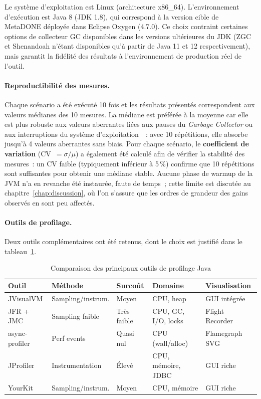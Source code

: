 Le système d'exploitation est Linux (architecture x86\_64). L'environnement
d'exécution est Java 8 (JDK 1.8), qui correspond à la version cible de
MetaDONE déployée dans Eclipse Oxygen (4.7.0). Ce choix contraint certaines
options de collecteur GC disponibles dans les versions ultérieures du JDK
(ZGC et Shenandoah n'étant disponibles qu'à partir de Java 11 et 12
respectivement), mais garantit la fidélité des résultats à l'environnement
de production réel de l'outil.

\paragraph{Reproductibilité des mesures.}
Chaque scénario a été exécuté 10 fois et les résultats présentés correspondent aux valeurs médianes des 10 mesures. La médiane est préférée à la moyenne car elle est plus robuste aux valeurs aberrantes liées aux pauses du \textit{Garbage Collector} ou aux interruptions du système d'exploitation~\cite{georges2007statistically}~: avec 10 répétitions, elle absorbe jusqu'à 4 valeurs aberrantes sans biais. Pour chaque scénario, le \textbf{coefficient de variation} (CV~$= \sigma / \mu$) a également été calculé afin de vérifier la stabilité des mesures~: un CV faible (typiquement inférieur à 5\,\%) confirme que 10 répétitions sont suffisantes pour obtenir une médiane stable. Aucune phase de warmup de la JVM n'a en revanche été instaurée, faute de temps~; cette limite est discutée au chapitre~\ref{chap:discussion}, où l'on s'assure que les ordres de grandeur des gains observés en sont peu affectés.

\paragraph{Outils de profilage.}
Deux outils complémentaires ont été retenus, dont le choix est justifié dans
le tableau~\ref{tab:profilers}.

\begin{table}[h]
\centering
\caption{Comparaison des principaux outils de profilage Java}
\label{tab:profilers}
\small
\begin{tabular}{lllll}
\hline
\textbf{Outil} & \textbf{Méthode} & \textbf{Surcoût} &
\textbf{Domaine} & \textbf{Visualisation} \\
\hline
JVisualVM    & Sampling/instrum. & Moyen    & CPU, heap       & GUI intégrée \\
JFR + JMC    & Sampling faible   & Très faible & CPU, GC, I/O, locks & Flight Recorder \\
async-profiler & Perf events     & Quasi nul & CPU (wall/alloc) & Flamegraph SVG \\
JProfiler    & Instrumentation   & Élevé    & CPU, mémoire, JDBC & GUI riche \\
YourKit      & Sampling/instrum. & Moyen    & CPU, mémoire    & GUI riche \\
\hline
\end{tabular}
\end{table}


